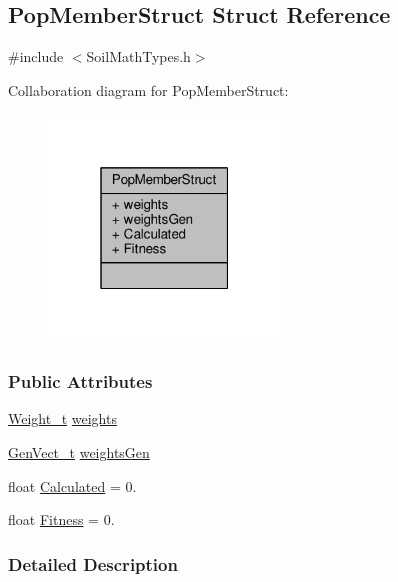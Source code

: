 \hypertarget{struct_pop_member_struct}{}\subsection{Pop\+Member\+Struct Struct Reference}
\label{struct_pop_member_struct}


{\ttfamily \#include $<$Soil\+Math\+Types.\+h$>$}



Collaboration diagram for Pop\+Member\+Struct\+:
\nopagebreak
\begin{figure}[H]
\begin{center}
\leavevmode
\includegraphics[width=175pt]{struct_pop_member_struct__coll__graph}
\end{center}
\end{figure}
\subsubsection*{Public Attributes}
\begin{DoxyCompactItemize}
\item 
\hyperlink{_soil_math_types_8h_ac56ad2b88186620fd0de0d213aa715dd}{Weight\+\_\+t} \hyperlink{struct_pop_member_struct_aeba960170ef60a906c730cc24cd90367}{weights}
\item 
\hyperlink{_soil_math_types_8h_a1447b70c8b8604a379eb96cdce9d2152}{Gen\+Vect\+\_\+t} \hyperlink{struct_pop_member_struct_a072fadb4863e0cf77b55ad3b46b62522}{weights\+Gen}
\item 
float \hyperlink{struct_pop_member_struct_a8e76eeb476bc89f765b1d872d399fe0c}{Calculated} = 0.
\item 
float \hyperlink{struct_pop_member_struct_a750ec8010731e3e2a876051475c31b14}{Fitness} = 0.
\end{DoxyCompactItemize}


\subsubsection{Detailed Description}


